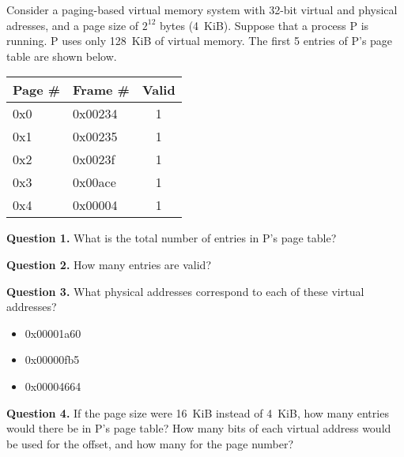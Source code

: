 \documentclass[letterpaper,twocolumn,10pt]{article}
\begin{document}
Consider a paging-based virtual memory system with 32-bit virtual and physical 
adresses, and a page size of $2^{12}$ bytes (4~KiB).  Suppose that a process P 
is running. P uses only 128~KiB of virtual memory.  The first 5 entries of P's 
page table are shown below.

\begin{table}
\centering
\begin{tabular}{l|l|c}
\toprule
Page \# & Frame \# & Valid \\
\midrule
0x0 & 0x00234 & 1\\
    0x1 & 0x00235 & 1\\
    0x2 & 0x0023f & 1\\
    0x3 & 0x00ace & 1\\
    0x4 & 0x00004 & 1\\
\bottomrule
\end{tabular}
\end{table}

\vspace{4em}

\noindent
\textbf{Question 1.} What is the total number of entries in P's page table?

\vspace{16em}

\noindent
\textbf{Question 2.} How many entries are valid?

\vspace{16em}
\break

\textbf{Question 3.} What physical addresses correspond to each of these 
virtual addresses?

\begin{itemize}
\item 0x00001a60
\item 0x00000fb5
\item 0x00004664
\end{itemize}

\vspace{16em}

\textbf{Question 4.} If the page size were 16~KiB instead of 4~KiB, how many 
entries would there be in P's page table?  How many bits of each virtual 
address would be used for the offset, and how many for the page number?
\end{document}

